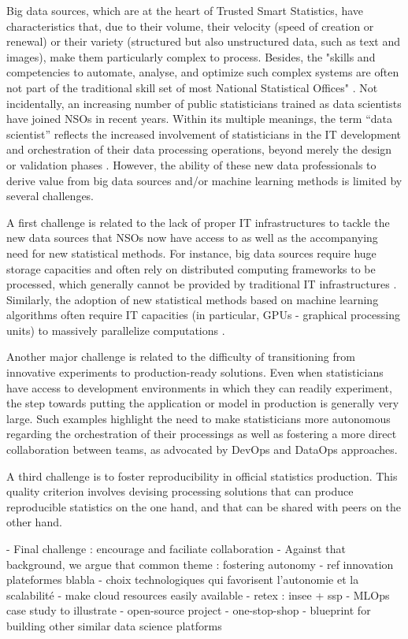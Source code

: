Big data sources, which are at the heart of Trusted Smart Statistics, have characteristics that, due to their volume, their velocity (speed of creation or renewal) or their variety (structured but also unstructured data, such as text and images), make them particularly complex to process. Besides, the "skills and competencies to automate, analyse, and optimize such complex systems are often not part of the traditional skill set of most National Statistical Offices" \cite{ashofteh2021data}. Not incidentally, an increasing number of public statisticians trained as data scientists have joined NSOs in recent years. Within its multiple meanings, the term “data scientist” reflects the increased involvement of statisticians in the IT development and orchestration of their data processing operations, beyond merely the design or validation phases \cite{davenport2012data}. However, the ability of these new data professionals to derive value from big data sources and/or machine learning methods is limited by several challenges.

A first challenge is related to the lack of proper IT infrastructures to tackle the new data sources that NSOs now have access to as well as the accompanying need for new statistical methods. For instance, big data sources require huge storage capacities and often rely on distributed computing frameworks to be processed, which generally cannot be provided by traditional IT infrastructures \cite{liu2013computing}. Similarly, the adoption of new statistical methods based on machine learning algorithms often require IT capacities (in particular, GPUs - graphical processing units) to massively parallelize computations \cite{saiyeda2017cloud}.

Another major challenge is related to the difficulty of transitioning from innovative experiments to production-ready solutions. Even when statisticians have access to development environments in which they can readily experiment, the step towards putting the application or model in production is generally very large. Such examples highlight the need to make statisticians more autonomous regarding the orchestration of their processings as well as fostering a more direct collaboration between teams, as advocated by DevOps and DataOps approaches.

A third challenge is to foster reproducibility in official statistics production. This quality criterion involves devising processing solutions that can produce reproducible statistics on the one hand, and that can be shared with peers on the other hand.

- Final challenge : encourage and faciliate collaboration
- Against that background, we argue that common theme : fostering autonomy
- ref innovation plateformes blabla
- choix technologiques qui favorisent l'autonomie et la scalabilité
- make cloud resources easily available
- retex : insee + ssp
- MLOps case study to illustrate
- open-source project
- one-stop-shop
- blueprint for building other similar data science platforms 